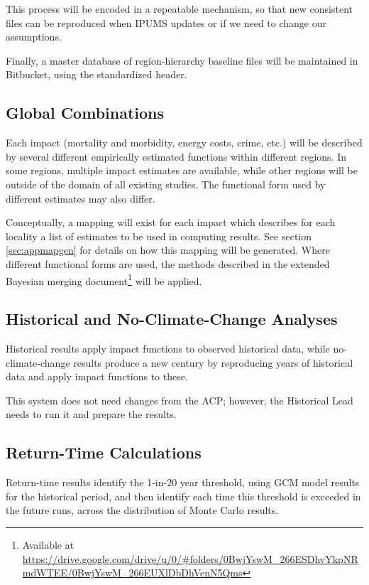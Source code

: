 \documentclass[12pt, oneside]{amsart}
\begin{document}
This process will be encoded in a repeatable mechanism, so that new
consistent files can be reproduced when IPUMS updates or if we need to
change our assumptions.

Finally, a master database of region-hierarchy baseline files will be
maintained in Bitbucket, using the standardized header.

\subsection{Global Combinations}
\label{sec:globalcombo}

Each impact (mortality and morbidity, energy costs, crime, etc.) will be described by several different empirically estimated functions within different regions.  In some regions, multiple impact estimates are available, while other regions will be outside of the domain of all existing studies.  The functional form used by different estimates may also differ.

Conceptually, a mapping will exist for each impact which describes for each locality a list of estimates to be used in computing results.  See section \ref{sec:appmapgen} for details on how this mapping will be generated.  Where different functional forms are used, the methods described in the extended Bayesian merging document\footnote{Available at \url{https://drive.google.com/drive/u/0/#folders/0BwjYswM_266ESDhvYkpNRmdWTEE/0BwjYswM_266EUXlDbDhVenN5Qms}} will be applied.

\subsection{Historical and No-Climate-Change Analyses}
\label{sec:historical}

Historical results apply impact functions to observed historical data,
while no-climate-change results produce a new century by reproducing
years of historical data and apply impact functions to these.

This system does not need changes from the ACP; however, the
Historical Lead needs to run it and prepare the results.

\subsection{Return-Time Calculations}
\label{sec:returntime}

Return-time results identify the 1-in-20 year threshold, using GCM
model results for the historical period, and then identify each time
this threshold is exceeded in the future runs, across the distribution
of Monte Carlo results.
\end{document}
